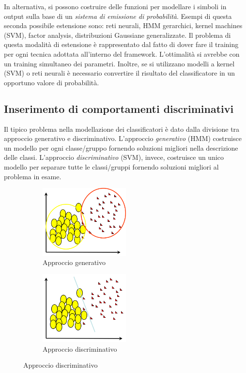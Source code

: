 \documentclass[a4paper,oneside,titlepage]{book}
\begin{document}
\noindent
In alternativa, si possono costruire delle funzioni per modellare i simboli in output sulla base di un \textit{sistema di emissione di probabilità}. Esempi di questa seconda possibile estensione sono: reti neurali, HMM gerarchici, kernel machines (SVM), factor analysis, distribuzioni Gaussiane generalizzate. Il problema di questa modalità di estensione è rappresentato dal fatto di dover fare il training per ogni tecnica adottata all'interno del framework. L'ottimalità si avrebbe con un training simultaneo dei parametri. Inoltre, se si utilizzano modelli a kernel (SVM) o reti neurali è necessario convertire il risultato del classificatore in un opportuno valore di probabilità.

\subsection{Inserimento di comportamenti discriminativi}
Il tipico problema nella modellazione dei classificatori è dato dalla divisione tra approccio generativo e discriminativo. L'approccio \textit{generativo} (HMM) costruisce un modello per ogni classe/gruppo fornendo soluzioni migliori nella descrizione delle classi. L'approccio \textit{discriminativo} (SVM), invece, costruisce un unico modello per separare tutte le classi/gruppi fornendo soluzioni migliori al problema in esame.
\begin{figure}[htp]
	\begin{subfigure}{0.49\textwidth}
	    \centering
		\includegraphics[width=0.5\textwidth]{gen.png}
		\caption{Approccio generativo}
	\end{subfigure}
	\hfill
	\begin{subfigure}{0.49\textwidth}
	    \centering
		\includegraphics[width=0.5\textwidth]{discr.png}
		\caption{Approccio discriminativo}
	\end{subfigure}
\end{figure}
\end{document}
